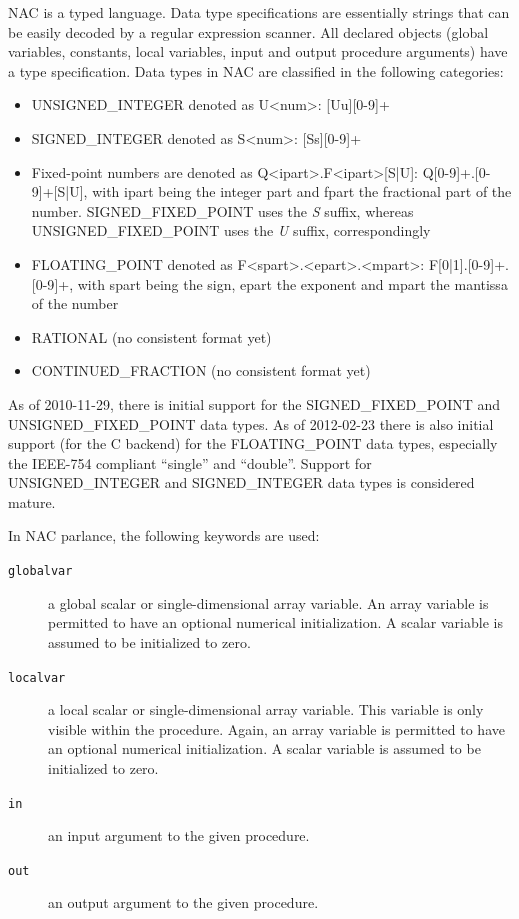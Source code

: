 \documentclass[a4paper]{article}
\providecommand*{\DUroletitlereference}[1]{\textsl{#1}}
\begin{document}
NAC is a typed language. Data type specifications are essentially strings that
can be easily decoded by a regular expression scanner. All declared objects
(global variables, constants, local variables, input and output procedure
arguments) have a type specification. Data types in NAC are classified in the
following categories:
%
\begin{itemize}

\item UNSIGNED\_INTEGER denoted as U<num>: {[}Uu{]}{[}0-9{]}+

\item SIGNED\_INTEGER denoted as S<num>: {[}Ss{]}{[}0-9{]}+

\item Fixed-point numbers are denoted as Q<ipart>.F<ipart>{[}S|U{]}: Q{[}0-9{]}+.{[}0-9{]}+{[}S|U{]},
with ipart being the integer part and fpart the fractional part of the number.
SIGNED\_FIXED\_POINT uses the \DUroletitlereference{S} suffix, whereas UNSIGNED\_FIXED\_POINT uses the
\DUroletitlereference{U} suffix, correspondingly

\item FLOATING\_POINT denoted as F<spart>.<epart>.<mpart>: F{[}0|1{]}.{[}0-9{]}+.{[}0-9{]}+,
with spart being the sign, epart the exponent and mpart the mantissa of the
number

\item RATIONAL (no consistent format yet)

\item CONTINUED\_FRACTION (no consistent format yet)

\end{itemize}

As of 2010-11-29, there is initial support for the SIGNED\_FIXED\_POINT and
UNSIGNED\_FIXED\_POINT data types. As of 2012-02-23 there is also initial
support (for the C backend) for the FLOATING\_POINT data types, especially
the IEEE-754 compliant ``single'' and ``double''. Support for UNSIGNED\_INTEGER
and SIGNED\_INTEGER data types is considered mature.

In NAC parlance, the following keywords are used:
%
\begin{description}
\item[{\texttt{globalvar}}] \leavevmode 
a global scalar or single-dimensional array variable. An array
variable is permitted to have an optional numerical initialization. A scalar
variable is assumed to be initialized to zero.

\item[{\texttt{localvar}}] \leavevmode 
a local scalar or single-dimensional array variable. This variable
is only visible within the procedure. Again, an array variable is permitted to
have an optional numerical initialization. A scalar variable is assumed to be
initialized to zero.

\item[{\texttt{in}}] \leavevmode 
an input argument to the given procedure.

\item[{\texttt{out}}] \leavevmode 
an output argument to the given procedure.

\end{description}
\end{document}
